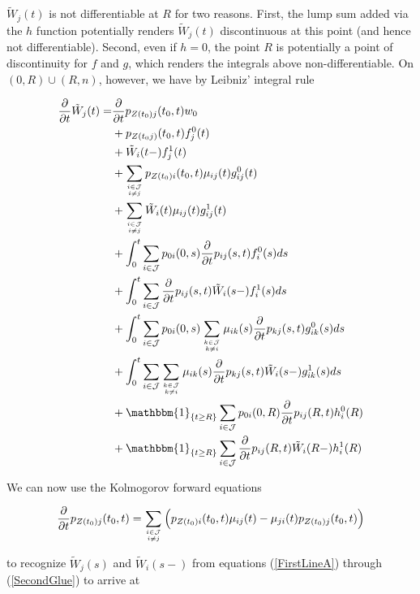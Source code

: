 \documentclass{book}
\newcommand{\1}[1]{\mathbbm{1}_{\left\lbrace #1 \right\rbrace}}
\theoremstyle{break}
\theoremstyle{remark}
\numberwithin{equation}{section}
\begin{document}
$\tilde{W}_j(t)$ is not differentiable at $R$ for two reasons. First, the lump sum added via the $h$ function potentially renders $\tilde{W}_j(t)$ discontinuous at this point (and hence not differentiable). Second, even if $h=0$, the point $R$ is potentially a point of discontinuity for $f$ and $g$, which renders the integrals above non-differentiable. On $(0,R)\cup(R,n)$, however, we have by Leibniz' integral rule

\begin{align*}
\frac{\partial}{\partial t} \tilde{W}_j(t) =& \frac{\partial}{\partial t} p_{Z(t_0)j}(t_0,t) w_0 \\
&+ p_{Z(t_0j)}(t_0,t) f_j^0(t) \\
&+ \tilde{W}_i(t-) f_j^1(t) \\
&+ \sum_{i \in \mathcal{J} \atop i \neq j} p_{Z(t_0)i}(t_0,t) \mu_{ij}(t) g_{ij}^0(t) \\
&+ \sum_{i \in \mathcal{J} \atop i \neq j} \tilde{W}_i(t) \mu_{ij}(t) g_{ij}^1(t) \\
&+ \int_0^t \sum_{i \in \mathcal{J}} p_{0i}(0,s) \frac{\partial}{\partial t} p_{ij}(s,t) f_i^0(s) ds \\
&+ \int_0^t \sum_{i \in \mathcal{J}} \frac{\partial}{\partial t} p_{ij}(s,t) \tilde{W}_i(s-) f_i^1(s) ds \\
&+ \int_0^t \sum_{i \in \mathcal{J}} p_{0i}(0,s) \sum_{k \in \mathcal{J} \atop k \neq i} \mu_{ik}(s) \frac{\partial}{\partial t} p_{kj}(s,t) g_{ik}^0(s) ds \\
&+ \int_0^t \sum_{i \in \mathcal{J}} \sum_{k \in \mathcal{J} \atop k \neq i} \mu_{ik}(s) \frac{\partial}{\partial t} p_{kj}(s,t) \tilde{W}_i(s-) g_{ik}^1(s) ds \\
&+ \1{t \geq R}\sum_{i \in \mathcal{J}} p_{0i}(0,R) \frac{\partial}{\partial t} p_{ij}(R,t) h_i^0(R) \\
&+ \1{t \geq R}\sum_{i \in \mathcal{J}} \frac{\partial}{\partial t} p_{ij}(R,t) \tilde{W}_i(R-) h_i^1(R)
\end{align*}

We can now use the Kolmogorov forward equations

\begin{align*}
\frac{\partial}{\partial t} p_{Z(t_0)j}(t_0,t) = \sum_{i \in \mathcal{J} \atop i \neq j} \left( p_{Z(t_0)i}(t_0,t) \mu_{ij}(t) - \mu_{ji}(t) p_{Z(t_0)j}(t_0,t) \right)
\end{align*}

to recognize $\tilde{W}_j(s)$ and $\tilde{W}_i(s-)$ from equations (\ref{FirstLineA}) through (\ref{SecondGlue}) to arrive at
\end{document}
